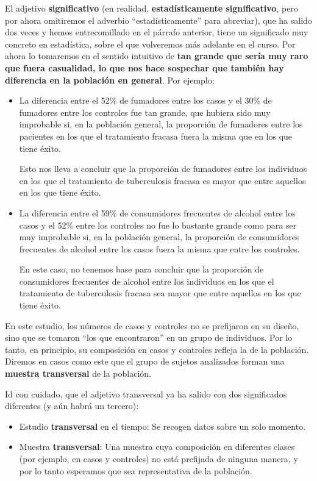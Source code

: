 \documentclass[
]{book}
\providecommand{\tightlist}{%
  \setlength{\itemsep}{0pt}\setlength{\parskip}{0pt}}
\theoremstyle{definition}
\theoremstyle{definition}
\theoremstyle{definition}
\theoremstyle{definition}
\theoremstyle{remark}
\begin{document}
El adjetivo \textbf{significativo} (en realidad, \textbf{estadísticamente significativo}, pero por ahora omitiremos el adverbio ``estadísticamente'' para abreviar), que ha salido dos veces y hemos entrecomillado en el párrafo anterior, tiene un significado muy concreto en estadística, sobre el que volveremos más adelante en el curso. Por ahora lo tomaremos en el sentido intuitivo de \textbf{tan grande que sería muy raro que fuera casualidad, lo que nos hace sospechar que también hay diferencia en la población en general}. Por ejemplo:

\begin{itemize}
\item
  La diferencia entre el 52\% de fumadores entre los casos y el 30\% de fumadores entre los controles fue tan grande, que hubiera sido muy improbable si, en la población general, la proporción de fumadores entre los pacientes en los que el tratamiento fracasa fuera la misma que en los que tiene éxito.

  Esto nos lleva a concluir que la proporción de fumadores entre los individuos en los que el tratamiento de tuberculosis fracasa es mayor que entre aquellos en los que tiene éxito.
\item
  La diferencia entre el 59\% de consumidores frecuentes de alcohol entre los casos y el 52\% entre los controles no fue lo bastante grande como para ser muy improbable si, en la población general, la proporción de consumidores frecuentes de alcohol entre los casos fuera la misma que entre los controles.

  En este caso, no tenemos base para concluir que la proporción de consumidores frecuentes de alcohol entre los individuos en los que el tratamiento de tuberculosis fracasa sea mayor que entre aquellos en los que tiene éxito.
\end{itemize}

En este estudio, los números de casos y controles no se prefijaron en su diseño, sino que se tomaron ``los que encontraron'' en un grupo de individuos. Por lo tanto, en principio, su composición en casos y controles refleja la de la población. Diremos en casos como este que el grupo de sujetos analizados forman una \textbf{muestra transversal} de la población.

\begin{rmdcaution}
Id con cuidado, que el adjetivo transversal ya ha salido con dos significados diferentes (y aún habrá un tercero):

\begin{itemize}
\tightlist
\item
  Estudio \textbf{transversal} en el tiempo: Se recogen datos sobre un solo momento.
\item
  Muestra \textbf{transversal}: Una muestra cuya composición en diferentes clases (por ejemplo, en casos y controles) no está prefijada de ninguna manera, y por lo tanto esperamos que sea representativa de la población.
\end{itemize}
\end{rmdcaution}
\end{document}
